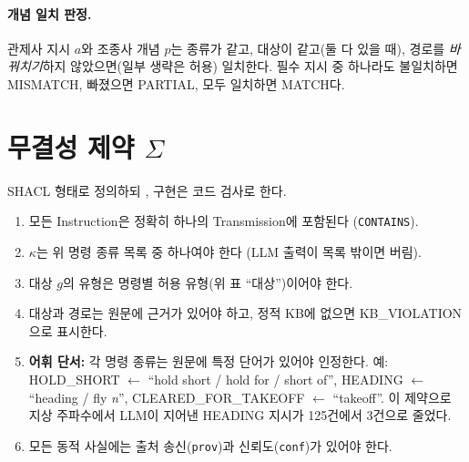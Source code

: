\documentclass[10pt,a4paper]{article}
\newcommand{\cmd}[1]{\textsf{\small #1}}
\begin{document}
\paragraph{개념 일치 판정.} 관제사 지시 $a$와 조종사 개념 $p$는 종류가 같고, 대상이 같고(둘 다 있을 때), 경로를 \emph{바꿔치기}하지 않았으면(일부 생략은 허용) 일치한다. 필수 지시 중 하나라도 불일치하면 \cmd{MISMATCH}, 빠졌으면 \cmd{PARTIAL}, 모두 일치하면 \cmd{MATCH}다.

\section{무결성 제약 $\Sigma$}
SHACL 형태로 정의하되 \cite{shacl}, 구현은 코드 검사로 한다.
\begin{enumerate}
\item 모든 \cmd{Instruction}은 정확히 하나의 \cmd{Transmission}에 포함된다 (\texttt{CONTAINS}).
\item $\kappa$는 위 명령 종류 목록 중 하나여야 한다 (LLM 출력이 목록 밖이면 버림).
\item 대상 $g$의 유형은 명령별 허용 유형(위 표 ``대상'')이어야 한다.
\item 대상과 경로는 원문에 근거가 있어야 하고, 정적 KB에 없으면 \cmd{KB\_VIOLATION}으로 표시한다.
\item \textbf{어휘 단서:} 각 명령 종류는 원문에 특정 단어가 있어야 인정한다. 예: \cmd{HOLD\_SHORT} $\leftarrow$ ``hold short / hold for / short of'', \cmd{HEADING} $\leftarrow$ ``heading / fly {\it n}'', \cmd{CLEARED\_FOR\_TAKEOFF} $\leftarrow$ ``takeoff''. 이 제약으로 지상 주파수에서 LLM이 지어낸 HEADING 지시가 125건에서 3건으로 줄었다.
\item 모든 동적 사실에는 출처 송신(\texttt{prov})과 신뢰도(\texttt{conf})가 있어야 한다.
\end{enumerate}

\end{document}
